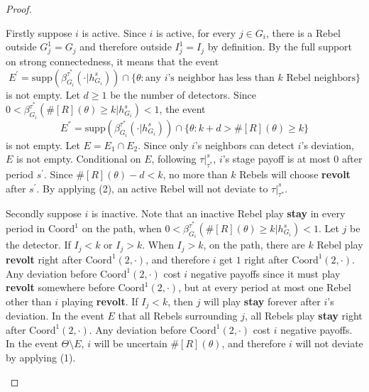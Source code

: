 \documentclass[12pt,letter]{article}
\newcommand{\Kappa}{\mathrm{Coord}}
\theoremstyle{definition}
\theoremstyle{remark}
\theoremstyle{claim}
\begin{document}
\begin{proof}
\begin{enumerate}[label=(\arabic*)]
Firstly suppose $i$ is active. Since $i$ is active, for every $j\in G_i$, there is a Rebel outside $G^1_j=G_j$ and therefore outside $I^1_j=I_j$ by definition. By the full support on strong connectedness, it means that the event
\[E^{'}=\mathrm{supp}(\beta^{\tau^{*}}_{G_i}(\cdot |h^s_{G_i}))\cap \{\theta:\text{any $i$'s neighbor has less than $k$ Rebel neighbors}\}\]
is not empty. Let $d\geq 1$ be the number of detectors. Since $0<\beta^{\tau^{*}}_{G_i}(\#[R](\theta)\geq k|h^s_{G_i})<1$, the event
\[E^{''}=\mathrm{supp}(\beta^{\tau^{*}}_{G_i}(\cdot |h^s_{G_i}))\cap \{\theta:k+d>\#[R](\theta)\geq k\}\] 
is not empty. Let $E=E_1\cap E_2$. Since only $i$'s neighbors can detect $i$'s deviation, $E$ is not empty. Conditional on $E$, following $\tau|^s_{\tau^{*}}$, $i$'s stage payoff is at most 0 after period $s^{'}$. Since $\#[R](\theta)-d<k$, no more than $k$ Rebels will choose \textbf{revolt} after $s^{'}$. By applying (2), an active Rebel will not deviate to $\tau|^s_{\tau^{*}}$.

Secondly suppose $i$ is inactive. Note that an inactive Rebel play \textbf{stay} in every period in $\Kappa^1$ on the path, when $0<\beta^{\tau^{*}}_{G_i}(\#[R](\theta)\geq k|h^s_{G_i})<1$. Let $j$ be the detector. If $I_j<k$ or $I_j>k$. When $I_j>k$, on the path, there are $k$ Rebel play \textbf{revolt} right after $\Kappa^1(2,\cdot)$, and therefore $i$ get $1$ right after $\Kappa^1(2,\cdot)$. Any deviation before $\Kappa^1(2,\cdot)$ cost $i$ negative payoffs since it must play \textbf{revolt} somewhere before $\Kappa^1(2,\cdot)$, but at every period at most one Rebel other than $i$ playing \textbf{revolt}. If $I_j<k$, then $j$ will play \textbf{stay} forever after $i$'s deviation. In the event $E$ that all Rebels surrounding $j$, all Rebels play \textbf{stay} right after $\Kappa^1(2,\cdot)$. Any deviation before $\Kappa^1(2,\cdot)$ cost $i$ negative payoffs. In the event $\Theta\setminus E$, $i$ will be uncertain $\#[R](\theta)$, and therefore $i$ will not deviate by applying (1).
\end{enumerate}
\end{proof}
\end{document}
